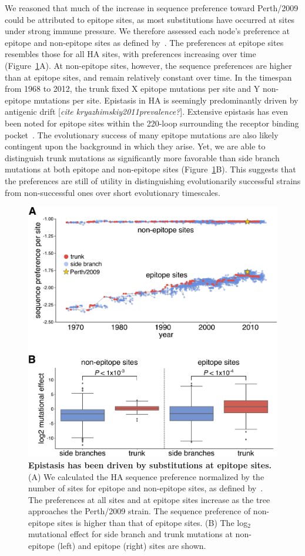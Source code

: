 \documentclass[9pt,twocolumn,twoside]{pnas-new}
\newcommand{\comment}[1]{{\color{red}[\textsl{#1}]}}
\begin{document}
We reasoned that much of the increase in sequence preference toward Perth/2009 could be attributed to epitope sites, as most substitutions have occurred at sites under strong immune pressure.
We therefore assessed each node's preference at epitope and non-epitope sites as defined by~\cite{wolf2006long}.
The preferences at epitope sites resembles those for all HA sites, with preferences increasing over time (Figure~\ref{fig:sequence_preference}A).
At non-epitope sites, however, the sequence preferences are higher than at epitope sites, and remain relatively constant over time.
In the timespan from 1968 to 2012, the trunk fixed X epitope mutations per site and Y non-epitope mutations per site.
Epistasis in HA is seemingly predominantly driven by antigenic drift \comment{cite kryazhimskiy2011prevalence?}. 
Extensive epistasis has even been noted for epitope sites within the 220-loop surrounding the receptor binding pocket~\cite{wu2017diversity}.
The evolutionary success of many epitope mutations are also likely contingent upon the background in which they arise.
Yet, we are able to distinguish trunk mutations as significantly more favorable than side branch mutations at both epitope and non-epitope sites (Figure~\ref{fig:sequence_preference}B). 
This suggests that the preferences are still of utility in distinguishing evolutionarily successful strains from non-successful ones over short evolutionary timescales. 

\begin{figure}
\centering
\includegraphics[width=11.4cm]{figs/sequence_preference/sequence_preference.pdf}
\caption{\label{fig:sequence_preference}
{\bf Epistasis has been driven by substitutions at epitope sites.}
(A) We calculated the HA sequence preference normalized by the number of sites for epitope and non-epitope sites, as defined by~\cite{wolf2006long}.
The preferences at all sites and at epitope sites increase as the tree approaches the Perth/2009 strain.
The sequence preference of non-epitope sites is higher than that of epitope sites.
(B) The log$_{2}$ mutational effect for side branch and trunk mutations at non-epitope (left) and epitope (right) sites are shown.
}
\end{figure}
\end{document}
